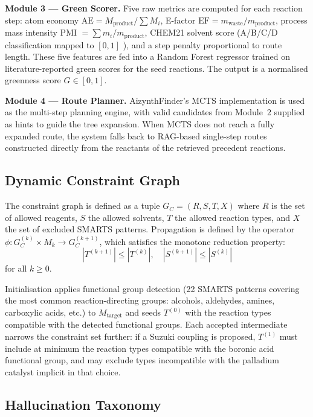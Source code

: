 \documentclass[12pt,a4paper]{article}
\begin{document}
\textbf{Module 3 — Green Scorer.}
Five raw metrics are computed for each reaction step: atom economy
$\text{AE} = M_{\text{product}} / \sum M_i$, E-factor
$\text{EF} = m_{\text{waste}} / m_{\text{product}}$, process mass intensity
PMI $= \sum m_i / m_{\text{product}}$, CHEM21 solvent score (A/B/C/D
classification mapped to $[0, 1]$ \cite{henderson2011chem21}), and a step
penalty proportional to route length. These five features are fed into a
Random Forest regressor \cite{breiman2001random} trained on literature-reported
green scores for the seed reactions. The output is a normalised greenness score
$G \in [0, 1]$.

\textbf{Module 4 — Route Planner.}
AizynthFinder's MCTS implementation \cite{genheden2020aizynthfinder} is used
as the multi-step planning engine, with valid candidates from Module~2 supplied
as hints to guide the tree expansion. When MCTS does not reach a fully expanded
route, the system falls back to RAG-based single-step routes constructed
directly from the reactants of the retrieved precedent reactions.

\subsection{Dynamic Constraint Graph}

The constraint graph is defined as a tuple
$G_C = (R, S, T, X)$ where $R$ is the set of allowed reagents, $S$ the
allowed solvents, $T$ the allowed reaction types, and $X$ the set of excluded
SMARTS patterns. Propagation is defined by the operator
$\phi: G_C^{(k)} \times M_k \rightarrow G_C^{(k+1)}$, which satisfies
the monotone reduction property:
\begin{equation}
  |T^{(k+1)}| \leq |T^{(k)}|, \quad |S^{(k+1)}| \leq |S^{(k)}|
\end{equation}
for all $k \geq 0$.

Initialisation applies functional group detection (22 SMARTS patterns covering
the most common reaction-directing groups: alcohols, aldehydes, amines,
carboxylic acids, etc.) to $M_{\text{target}}$ and seeds $T^{(0)}$ with the
reaction types compatible with the detected functional groups. Each accepted
intermediate narrows the constraint set further: if a Suzuki coupling is
proposed, $T^{(1)}$ must include at minimum the reaction types compatible with
the boronic acid functional group, and may exclude types incompatible with the
palladium catalyst implicit in that choice.

\subsection{Hallucination Taxonomy}
\end{document}
